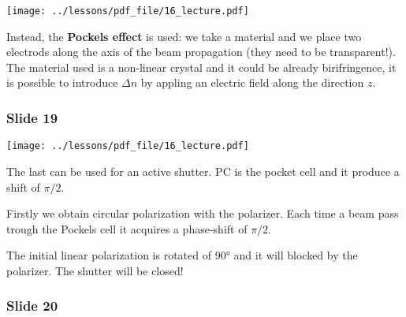 \documentclass[../main/main.tex]{subfiles}
\begin{document}
\begin{minipage}[]{0.5\linewidth}
\centering
\texttt{[image: ../lessons/pdf\_file/16\_lecture.pdf]}
\end{minipage}
\hspace{0.3cm}\vspace{0.3cm}
\begin{minipage}[c]{0.47\linewidth}

Instead, the \textbf{Pockels effect} is used: we take a material and we place two electrods along the axis of the beam propagation (they need to be transparent!). The material used is a non-linear crystal and it could be already birifringence, it is possible to introduce \( \Delta n \) by appling an electric field along the direction \( z \).

\end{minipage}

\subsubsection*{Slide 19}

\begin{minipage}[]{0.5\linewidth}
\centering
\texttt{[image: ../lessons/pdf\_file/16\_lecture.pdf]}
\end{minipage}
\hspace{0.3cm}\vspace{0.3cm}
\begin{minipage}[c]{0.47\linewidth}

The last can be used for an active shutter. PC is the pocket cell and it produce a shift of \( \pi /2 \).

Firstly we obtain circular polarization with the polarizer.
Each time a beam pass trough the Pockels cell it acquires a phase-shift of \( \pi /2 \).

The initial linear polarization is rotated of 90° and it will blocked by the polarizer. The shutter will be closed!

\end{minipage}

\subsubsection*{Slide 20}
\end{document}
